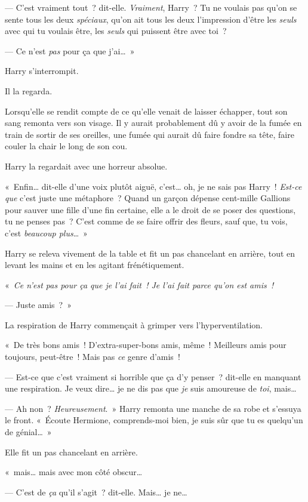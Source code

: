 --- C'est vraiment tout~? dit-elle. \emph{Vraiment}, Harry~? Tu ne voulais pas qu'on se sente tous les deux \emph{spéciaux}, qu'on ait tous les deux l'impression d'être les \emph{seuls} avec qui tu voulais être, les \emph{seuls} qui puissent être avec toi~?

--- Ce n'est \emph{pas} pour ça que j'ai…~»

Harry s'interrompit.

Il la regarda.

Lorsqu'elle se rendit compte de ce qu'elle venait de laisser échapper, tout son sang remonta vers son visage. Il y aurait probablement dû y avoir de la fumée en train de sortir de ses oreilles, une fumée qui aurait dû faire fondre sa tête, faire couler la chair le long de son cou.

Harry la regardait avec une horreur absolue.

«~Enfin… dit-elle d'une voix plutôt aiguë, c'est… oh, je ne sais pas Harry~! \emph{Est-ce que} c'est juste une métaphore~? Quand un garçon dépense cent-mille Gallions pour sauver une fille d'une fin certaine, elle a le droit de se poser des questions, tu ne penses pas~? C'est comme de se faire offrir des fleurs, sauf que, tu vois, c'est \emph{beaucoup plus}…~»

Harry se releva vivement de la table et fit un pas chancelant en arrière, tout en levant les mains et en les agitant frénétiquement.

«~\emph{Ce n'est pas pour ça que je l'ai fait~! Je l'ai fait parce qu'on est amis~!}

--- Juste amis~?~»

La respiration de Harry commençait à grimper vers l'hyperventilation.

«~De très bons amis~! D'extra-super-bons amis, même~! Meilleurs amis pour toujours, peut-être~! Mais pas \emph{ce} genre d'amis~!

--- Est-ce que c'est vraiment si horrible que ça d'y penser~? dit-elle en manquant une respiration. Je veux dire… je ne dis pas que \emph{je} suis amoureuse de \emph{toi}, mais…

--- Ah non~? \emph{Heureusement}.~» Harry remonta une manche de sa robe et s'essuya le front. «~Écoute Hermione, comprends-moi bien, je suis sûr que tu es quelqu'un de génial…~»

Elle fit un pas chancelant en arrière.

«~mais… mais avec mon côté obscur…

--- C'est de \emph{ça} qu'il s'agit~? dit-elle. Mais… je ne…

